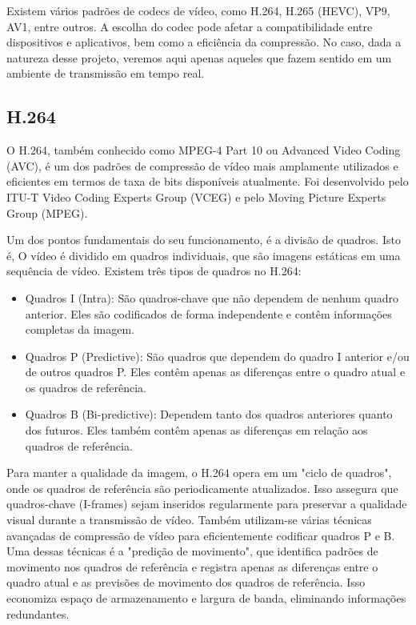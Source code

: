 \documentclass[12pt, %
openright, 
oneside, %
a4paper,    %
brazil]{facom-ufu-abntex2}
\begin{document}
Existem vários padrões de codecs de vídeo, como H.264, H.265 (HEVC), VP9, AV1,
entre outros. A escolha do codec pode afetar a compatibilidade entre
dispositivos e aplicativos, bem como a eficiência da compressão. No caso, dada
a natureza desse projeto, veremos aqui apenas aqueles que fazem sentido em um
ambiente de transmissão em tempo real.

\subsection{H.264}

O H.264, também conhecido como MPEG-4 Part 10 ou Advanced Video Coding (AVC), é
um dos padrões de compressão de vídeo mais amplamente utilizados e eficientes
em termos de taxa de bits disponíveis atualmente. Foi desenvolvido pelo ITU-T
Video Coding Experts Group (VCEG) e pelo Moving Picture Experts Group (MPEG).

Um dos pontos fundamentais do seu funcionamento, é a divisão de quadros. Isto
é, O vídeo é dividido em quadros individuais, que são imagens estáticas em uma
sequência de vídeo. Existem três tipos de quadros no H.264:

\begin{itemize}
	\item Quadros I (Intra): São quadros-chave que não dependem de nenhum quadro
	      anterior. Eles são codificados de forma independente e contêm informações
	      completas da imagem.
	\item Quadros P (Predictive): São quadros que dependem do quadro I anterior e/ou de
	      outros quadros P. Eles contêm apenas as diferenças entre o quadro atual e os
	      quadros de referência.
	\item Quadros B (Bi-predictive): Dependem tanto dos quadros anteriores quanto dos
	      futuros. Eles também contêm apenas as diferenças em relação aos quadros de
	      referência.
\end{itemize}

Para manter a qualidade da imagem, o H.264 opera em um "ciclo de quadros", onde
os quadros de referência são periodicamente atualizados. Isso assegura que
quadros-chave (I-frames) sejam inseridos regularmente para preservar a
qualidade visual durante a transmissão de vídeo. Também utilizam-se várias
técnicas avançadas de compressão de vídeo para eficientemente codificar quadros
P e B. Uma dessas técnicas é a "predição de movimento", que identifica padrões
de movimento nos quadros de referência e registra apenas as diferenças entre o
quadro atual e as previsões de movimento dos quadros de referência. Isso
economiza espaço de armazenamento e largura de banda, eliminando informações
redundantes.
\end{document}

